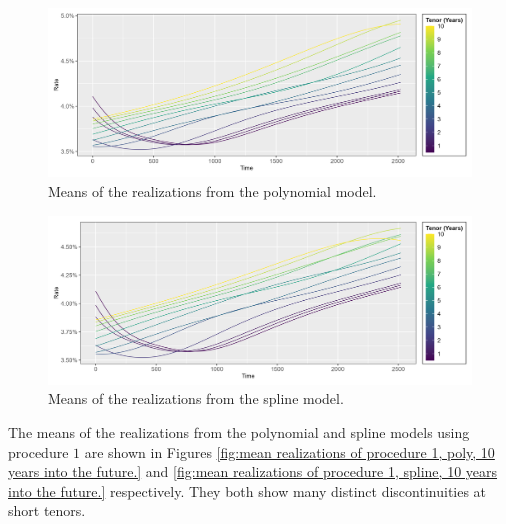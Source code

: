 \begin{figure}[!htbp]
    \centering
    \includegraphics[width=.95\linewidth]{Figures/Simulated Interest Rates/zero_coupon_yields_phase_3_HJM_2F_poly_model_simulated_10Y_mean_small_time_plot.png}
    
    \caption[Mean of the realizations, Polynomial Model]{Means of the realizations from the polynomial model.}
    \label{fig:mean realizations of poly wo extrapolation, 10 years into the future.}
\end{figure}

\begin{figure}[!htbp]
    \centering
    \includegraphics[width=.95\linewidth]{Figures/Simulated Interest Rates/zero_coupon_yields_phase_3_HJM_2F_spline_model_simulated_10Y_mean_small_time_plot.png}
    
    \caption[Mean of the realizations, Spline Model]{Means of the realizations from the spline model.}
    \label{fig:mean realizations of spline wo extrapolation, 10 years into the future.}
\end{figure}

\newpage

The means of the realizations from the polynomial and spline models using procedure $1$ are shown in Figures \ref{fig:mean realizations of procedure 1, poly, 10 years into the future.} and \ref{fig:mean realizations of procedure 1, spline, 10 years into the future.} respectively. They both show many distinct discontinuities at short tenors.

